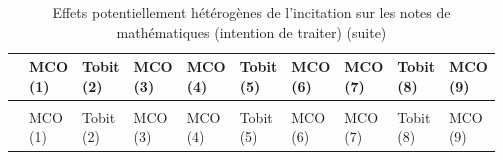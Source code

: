 \documentclass[
]{book}
\begin{document}
\begin{landscape}
\begin{ThreePartTable}
\begin{longtable}[t]{llllllllll}
\cmidrule(l{3pt}r{3pt}){2-3} \cmidrule(l{3pt}r{3pt}){4-4} \cmidrule(l{3pt}r{3pt}){5-6} \cmidrule(l{3pt}r{3pt}){7-7} \cmidrule(l{3pt}r{3pt}){8-9} \cmidrule(l{3pt}r{3pt}){10-10}
  & \makecell{MCO \\ (1) } & \makecell{Tobit \\ (2) } & \makecell{MCO \\ (3) } & \makecell{MCO \\ (4) } & \makecell{Tobit \\ (5) } & \makecell{MCO \\ (6) } & \makecell{MCO \\ (7) } & \makecell{Tobit \\ (8) } & \makecell{MCO \\ (9) }\\
\midrule
\endfirsthead
\caption[]{\label{tab:g20rfheteromodels}Effets potentiellement hétérogènes de l'incitation sur les notes de mathématiques (intention de traiter) (suite)}\\
\toprule
  & \makecell{MCO \\ (1) } & \makecell{Tobit \\ (2) } & \makecell{MCO \\ (3) } & \makecell{MCO \\ (4) } & \makecell{Tobit \\ (5) } & \makecell{MCO \\ (6) } & \makecell{MCO \\ (7) } & \makecell{Tobit \\ (8) } & \makecell{MCO \\ (9) }\\
\midrule
\endhead


\end{longtable}
\end{ThreePartTable}
\end{landscape}
\end{document}
